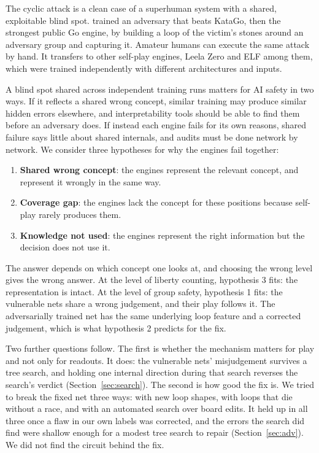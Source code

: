 \documentclass[11pt]{article}
\begin{document}
The cyclic attack is a clean case of a superhuman system with a shared, exploitable blind spot. \citet{wang2023adversarial} trained an adversary that beats KataGo, then the strongest public Go engine, by building a loop of the victim's stones around an adversary group and capturing it. Amateur humans can execute the same attack by hand. It transfers to other self-play engines, Leela Zero and ELF among them, which were trained independently with different architectures and inputs.

A blind spot shared across independent training runs matters for AI safety in two ways. If it reflects a shared wrong concept, similar training may produce similar hidden errors elsewhere, and interpretability tools should be able to find them before an adversary does. If instead each engine fails for its own reasons, shared failure says little about shared internals, and audits must be done network by network. We consider three hypotheses for why the engines fail together:
\begin{enumerate}
\item \textbf{Shared wrong concept}: the engines represent the relevant concept, and represent it wrongly in the same way.
\item \textbf{Coverage gap}: the engines lack the concept for these positions because self-play rarely produces them.
\item \textbf{Knowledge not used}: the engines represent the right information but the decision does not use it.
\end{enumerate}

The answer depends on which concept one looks at, and choosing the wrong level gives the wrong answer. At the level of liberty counting, hypothesis 3 fits: the representation is intact. At the level of group safety, hypothesis 1 fits: the vulnerable nets share a wrong judgement, and their play follows it. The adversarially trained net has the same underlying loop feature and a corrected judgement, which is what hypothesis 2 predicts for the fix.

Two further questions follow. The first is whether the mechanism matters for play and not only for readouts. It does: the vulnerable nets' misjudgement survives a tree search, and holding one internal direction during that search reverses the search's verdict (Section~\ref{sec:search}). The second is how good the fix is. We tried to break the fixed net three ways: with new loop shapes, with loops that die without a race, and with an automated search over board edits. It held up in all three once a flaw in our own labels was corrected, and the errors the search did find were shallow enough for a modest tree search to repair (Section~\ref{sec:adv}). We did not find the circuit behind the fix.
\end{document}
